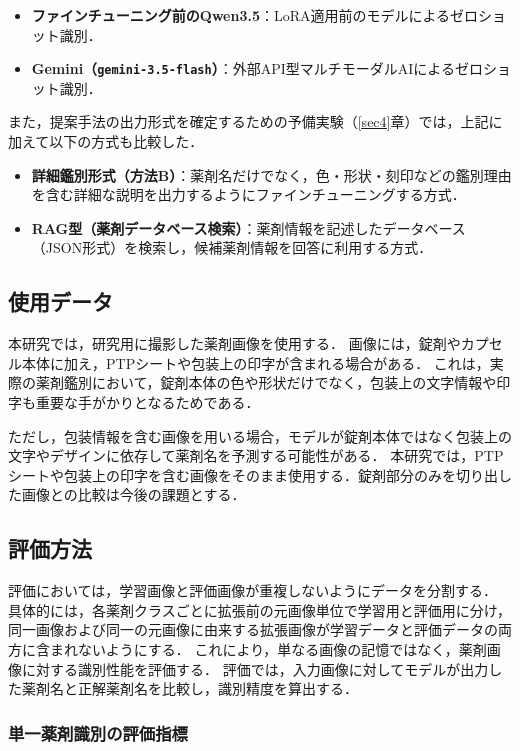 \documentclass[dvipdfmx]{jsarticle}
\begin{document}
\begin{itemize}
  \item \textbf{ファインチューニング前のQwen3.5}：LoRA適用前のモデルによるゼロショット識別．
  \item \textbf{Gemini（\texttt{gemini-3.5-flash}）}：外部API型マルチモーダルAIによるゼロショット識別．
\end{itemize}

また，提案手法の出力形式を確定するための予備実験（\ref{sec4}章）では，上記に加えて以下の方式も比較した．

\begin{itemize}
  \item \textbf{詳細鑑別形式（方法B）}：薬剤名だけでなく，色・形状・刻印などの鑑別理由を含む詳細な説明を出力するようにファインチューニングする方式．
  \item \textbf{RAG型（薬剤データベース検索）}：薬剤情報を記述したデータベース（JSON形式）を検索し，候補薬剤情報を回答に利用する方式．
\end{itemize}

\subsection{使用データ}

本研究では，研究用に撮影した薬剤画像を使用する．
画像には，錠剤やカプセル本体に加え，PTPシートや包装上の印字が含まれる場合がある．
これは，実際の薬剤鑑別において，錠剤本体の色や形状だけでなく，包装上の文字情報や印字も重要な手がかりとなるためである．

ただし，包装情報を含む画像を用いる場合，モデルが錠剤本体ではなく包装上の文字やデザインに依存して薬剤名を予測する可能性がある．
本研究では，PTPシートや包装上の印字を含む画像をそのまま使用する．錠剤部分のみを切り出した画像との比較は今後の課題とする．

\subsection{評価方法}

評価においては，学習画像と評価画像が重複しないようにデータを分割する．
具体的には，各薬剤クラスごとに拡張前の元画像単位で学習用と評価用に分け，同一画像および同一の元画像に由来する拡張画像が学習データと評価データの両方に含まれないようにする．
これにより，単なる画像の記憶ではなく，薬剤画像に対する識別性能を評価する．
評価では，入力画像に対してモデルが出力した薬剤名と正解薬剤名を比較し，識別精度を算出する．

\subsubsection{単一薬剤識別の評価指標}
\end{document}
